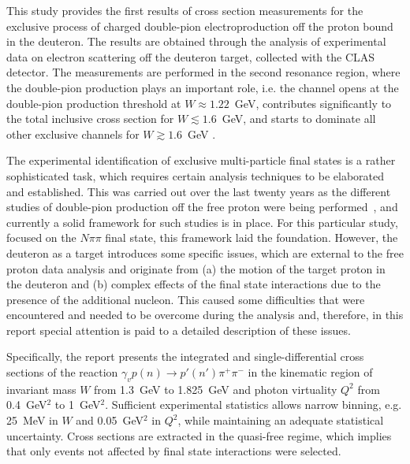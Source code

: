 This study provides the first results of cross section measurements for the exclusive process of charged double-pion electroproduction off the proton bound in the deuteron. The results are obtained through the analysis of experimental data on electron scattering off the deuteron target, collected with the CLAS detector. The measurements are performed in the second resonance region, where the double-pion production plays an important role, i.e. the channel opens at the double-pion production threshold at $W \approx 1.22$~GeV, contributes significantly to the total inclusive cross section for $W \lesssim 1.6$~GeV, and starts to dominate all other exclusive channels for $W \gtrsim 1.6$~GeV .

The experimental identification of exclusive multi-particle final states is a rather sophisticated task, which requires certain analysis techniques to be elaborated and established. This was carried out over the last twenty years as the different studies of double-pion production off the free proton were being performed~\cite{Rip_an_note:2002,Ripani:2002ss,Fed_an_note:2007,Fedotov:2008aa,Isupov:2017lnd,Golovach,Arjun,Fed_an_note:2017,Fed_paper_2018}, and currently a solid framework for such studies is in place. For this particular study, focused on the $N\pi\pi$ final state, this framework laid the foundation. However, the deuteron as a target introduces some specific issues, which are external to the free proton data analysis and originate from (a) the motion of the target proton in the deuteron and (b) complex effects of the final state interactions due to the presence of the additional nucleon. This caused some difficulties that were encountered and needed to be overcome during the analysis and, therefore, in this report special attention is paid to a detailed description of these issues.

Specifically, the report presents the integrated and single-differential cross sections of the reaction $\gamma_{v}p(n) \rightarrow p' (n')\pi^{+}\pi^{-}$ in the kinematic region of invariant mass $W$ from 1.3~GeV to 1.825~GeV and photon virtuality $Q^{2}$ from 0.4~GeV$^2$ to 1~GeV$^2$. Sufficient experimental statistics allows narrow binning, e.g. 25~MeV in $W$ and 0.05~GeV$^2$ in $Q^2$, while maintaining an adequate statistical uncertainty. Cross sections are extracted in the quasi-free regime, which implies that only events not affected by final state interactions were selected.


